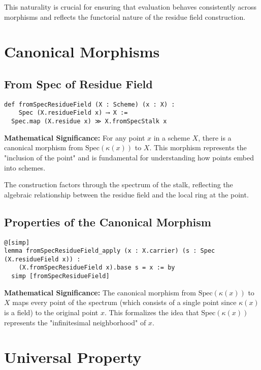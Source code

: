 \documentclass{article}
\theoremstyle{definition}
\begin{document}
This naturality is crucial for ensuring that evaluation behaves consistently across morphisms and reflects the functorial nature of the residue field construction.

\section{Canonical Morphisms}

\subsection{From Spec of Residue Field}

\begin{lstlisting}
def fromSpecResidueField (X : Scheme) (x : X) :
    Spec (X.residueField x) ⟶ X :=
  Spec.map (X.residue x) ≫ X.fromSpecStalk x
\end{lstlisting}

\textbf{Mathematical Significance:} For any point $x$ in a scheme $X$, there is a canonical morphism from $\mathrm{Spec}(\kappa(x))$ to $X$. This morphism represents the "inclusion of the point" and is fundamental for understanding how points embed into schemes.

The construction factors through the spectrum of the stalk, reflecting the algebraic relationship between the residue field and the local ring at the point.

\subsection{Properties of the Canonical Morphism}

\begin{lstlisting}
@[simp]
lemma fromSpecResidueField_apply (x : X.carrier) (s : Spec (X.residueField x)) :
    (X.fromSpecResidueField x).base s = x := by
  simp [fromSpecResidueField]
\end{lstlisting}

\textbf{Mathematical Significance:} The canonical morphism from $\mathrm{Spec}(\kappa(x))$ to $X$ maps every point of the spectrum (which consists of a single point since $\kappa(x)$ is a field) to the original point $x$. This formalizes the idea that $\mathrm{Spec}(\kappa(x))$ represents the "infinitesimal neighborhood" of $x$.

\section{Universal Property}
\end{document}
